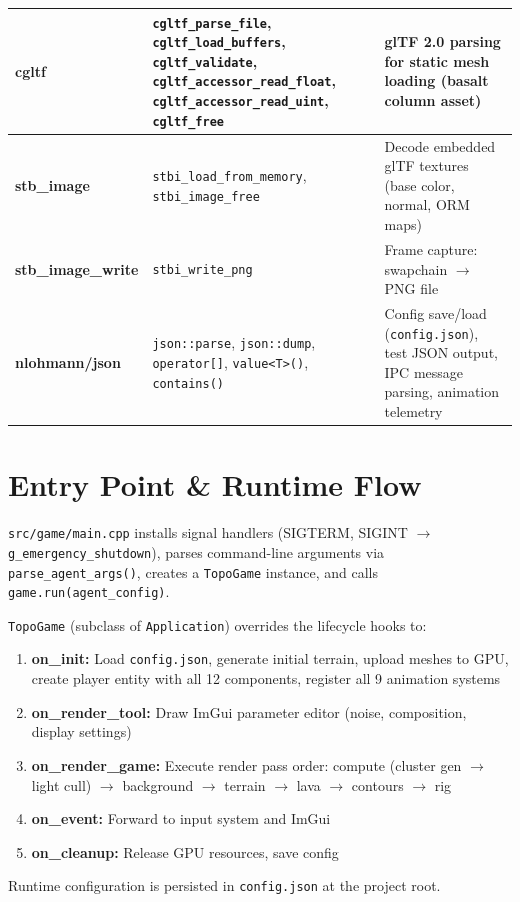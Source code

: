 \documentclass[11pt,a4paper]{article}
\begin{document}
\begin{longtable}{@{}p{2.2cm}p{5.5cm}p{5.5cm}@{}}
\midrule
\textbf{cgltf} &
  \texttt{cgltf\_parse\_file}, \texttt{cgltf\_load\_buffers}, \texttt{cgltf\_validate}, \texttt{cgltf\_accessor\_read\_float}, \texttt{cgltf\_accessor\_read\_uint}, \texttt{cgltf\_free} &
  glTF 2.0 parsing for static mesh loading (basalt column asset) \\
\midrule
\textbf{stb\_image} &
  \texttt{stbi\_load\_from\_memory}, \texttt{stbi\_image\_free} &
  Decode embedded glTF textures (base color, normal, ORM maps) \\
\midrule
\textbf{stb\_image\_write} &
  \texttt{stbi\_write\_png} &
  Frame capture: swapchain $\to$ PNG file \\
\midrule
\textbf{nlohmann/json} &
  \texttt{json::parse}, \texttt{json::dump}, \texttt{operator[]}, \texttt{value<T>()}, \texttt{contains()} &
  Config save/load (\texttt{config.json}), test JSON output, IPC message parsing, animation telemetry \\
\bottomrule
\end{longtable}

\section{Entry Point \& Runtime Flow}
\label{sec:entry}

\texttt{src/game/main.cpp} installs signal handlers (SIGTERM, SIGINT $\to$ \texttt{g\_emergency\_shutdown}), parses command-line arguments via \texttt{parse\_agent\_args()}, creates a \texttt{TopoGame} instance, and calls \texttt{game.run(agent\_config)}.

\texttt{TopoGame} (subclass of \texttt{Application}) overrides the lifecycle hooks to:
\begin{enumerate}
  \item \textbf{on\_init:} Load \texttt{config.json}, generate initial terrain, upload meshes to GPU, create player entity with all 12 components, register all 9 animation systems
  \item \textbf{on\_render\_tool:} Draw ImGui parameter editor (noise, composition, display settings)
  \item \textbf{on\_render\_game:} Execute render pass order: compute (cluster gen $\to$ light cull) $\to$ background $\to$ terrain $\to$ lava $\to$ contours $\to$ rig
  \item \textbf{on\_event:} Forward to input system and ImGui
  \item \textbf{on\_cleanup:} Release GPU resources, save config
\end{enumerate}

Runtime configuration is persisted in \texttt{config.json} at the project root.
\end{document}
